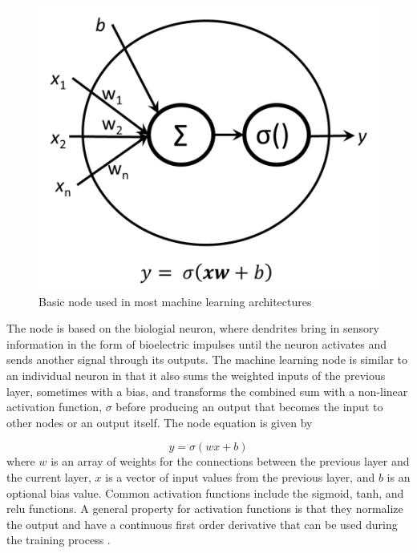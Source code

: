 \documentclass[10pt,a4paper,twocolumn]{article}
\begin{document}
\begin{figure}[]
\centering
\includegraphics[width=\columnwidth]{images/node.png}  %
\caption{Basic node used in most machine learning architectures }
\label{fig:node}
\end{figure}
%
The node is based on the biologial neuron, where dendrites bring in sensory information in the form of bioelectric impulses until the neuron activates and sends another signal through its outputs. The machine learning node is similar to an individual neuron in that it also sums the weighted inputs of the previous layer, sometimes with a bias, and transforms the combined sum with a non-linear activation function, $\sigma$ before producing an output that becomes the input to other nodes or an output itself. The node  equation is given by

\begin{equation}
\label{eq:perceptron}
y= \sigma(wx+b)
\end{equation}
\noindent
where $w$ is an array of weights for the connections between the previous layer and the current layer, $x$ is a vector of input values from the previous layer, and $b$ is an optional bias value. Common activation functions include the sigmoid, tanh, and relu functions. A general property for activation functions is that they normalize the output and have a continuous first order derivative that can be used during the training process \cite{Goodfellow2016}. 
\end{document}
